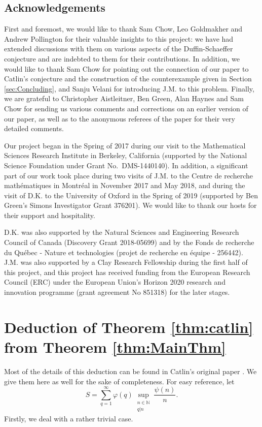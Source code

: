\documentclass[12pt]{amsart}
\numberwithin{equation}{section}
\theoremstyle{definition}
\theoremstyle{remark}
\newcommand{\N}{\mathbb{N}}
\renewcommand{\phi}{\varphi}
\begin{document}
\subsection*{Acknowledgements}
First and foremost, we would like to thank Sam Chow, Leo Goldmakher and Andrew Pollington for their valuable insights to this project: we have had extended discussions with them on various aspects of the Duffin-Schaeffer conjecture and are indebted to them for their contributions. In addition, we would like to thank Sam Chow for pointing out the connection of our paper to Catlin's conjecture and the construction of the counterexample given in Section \ref{sec:Concluding}, and Sanju Velani for introducing J.M. to this problem. Finally, we are grateful to Christopher Aistleitner, Ben Green, Alan Haynes and Sam Chow for sending us various comments and corrections on an earlier version of our paper, as well as to the anonymous referees of the paper for their very detailed comments.

Our project began in the Spring of 2017 during our visit to the Mathematical Sciences Research Institute in Berkeley, California (supported by the National Science Foundation under Grant No.~DMS-1440140). 
In addition, a significant part of our work took place during two visits of J.M. to the Centre de recherche math\'ematiques in Montr\'eal in November 2017 and May 2018, and during the visit of D.K. to the University of Oxford in the Spring of 2019 (supported by Ben Green's Simons Investigator Grant 376201). We would like to thank our hosts for their support and hospitality.

D.K. was also supported by the Natural Sciences and Engineering Research Council of Canada (Discovery Grant  2018-05699) and by the Fonds de recherche du Qu\'ebec - Nature et technologies (projet de recherche en \'equipe - 256442). J.M. was also supported by a Clay Research Fellowship during the first half of this project, and this project has received funding from the European Research Council (ERC) under the European Union's Horizon 2020 research and innovation programme (grant agreement No 851318) for the later stages.

\section{Deduction of Theorem \ref{thm:catlin} from Theorem \ref{thm:MainThm}}\label{sec:catlin}

Most of the details of this deduction can be found in Catlin's original paper \cite{catlin}. We give them here as well for the sake of completeness. For easy reference, let
\[
S=\sum_{q=1}^\infty \phi(q)\sup_{\substack{n\in\N\\ q|n}} \frac{\psi(n)}{n} .
\]
Firstly, we deal with a rather trivial case.
\end{document}
